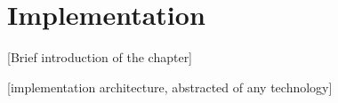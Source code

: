 \chapter{Implementation}
 [Brief introduction of the chapter]

 [implementation architecture, abstracted of any technology]
